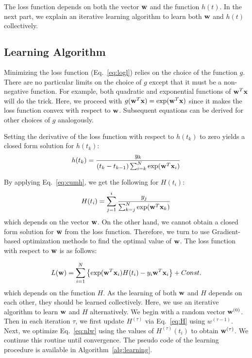 The loss function depends on both the vector $\mathbf{w}$ and the function $h(t)$. In the next part, we explain an iterative learning algorithm to learn both $\mathbf{w}$ and $h(t)$ collectively.

\subsection{Learning Algorithm}
Minimizing the loss function (Eq.~\ref{eq:logl}) relies on the choice of the function $g$. There are no particular limits on the choice of $g$ except that it must be a non-negative function. For example, both quadratic and exponential functions of $\mathbf{w}^T\mathbf{x}$ will do the trick. Here, we proceed with $g(\mathbf{w}^T\mathbf{x})=\exp(\mathbf{w}^T\mathbf{x})$ since it makes the loss function convex with respect to $\mathbf{w}$. Subsequent equations can be derived for other choices of $g$ analogously.

Setting the derivative of the loss function with respect to $h(t_k)$ to zero yields a closed form solution for $h(t_k)$:
\begin{equation}\label{eq:h}
h(t_k)=\frac{y_k}{(t_k-t_{k-1})\sum_{i=k}^{N}\exp(\mathbf{w}^T\mathbf{x}_i)}
\end{equation}

By applying Eq.~\ref{eq:cumh}, we get the following for $H(t_i)$:
\begin{equation}\label{eq:H}
H(t_i)=\sum_{j=1}^{i}\frac{y_j}{\sum_{k=j}^{N}\exp(\mathbf{w}^T\mathbf{x}_k)}
\end{equation}
which depends on the vector $\mathbf{w}$. On the other hand, we cannot obtain a closed form solution for $\mathbf{w}$ from the loss function. Therefore, we turn to use Gradient-based optimization methods to find the optimal value of $\mathbf{w}$. The loss function with respect to $\mathbf{w}$ is as follows:

\begin{equation}\label{eq:nlw}
L(\mathbf{w})=\sum_{i=1}^{N}\left\lbrace\exp(\mathbf{w}^T\mathbf{x}_i)H(t_i)-y_i\mathbf{w}^T\mathbf{x}_i\right\rbrace + Const.
\end{equation}
which depends on the function $H$. As the learning of both $\mathbf{w}$ and $H$ depends on each other, they should be learned collectively. Here, we use an iterative algorithm to learn $\mathbf{w}$ and $H$ alternatively. We begin with a random vector $\mathbf{w}^{(0)}$. Then in each iteration $\tau$, we first update $H^{(\tau)}$ via Eq.~\ref{eq:H} using $w^{(\tau-1)}$. Next, we optimize Eq.~\ref{eq:nlw} using the values of $H^{(\tau)}(t_i)$ to obtain $\mathbf{w}^{(\tau)}$. We continue this routine until convergence. The pseudo code of the learning procedure is available in Algorithm~\ref{alg:learning}.

